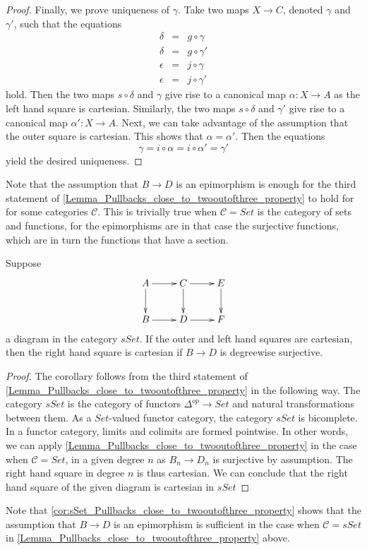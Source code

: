 \begin{proof}
Finally, we prove uniqueness of $\gamma$. Take two maps $X\to C$, denoted $\gamma$ and $\gamma '$, such that the equations
\begin{displaymath}
\begin{array}{rcl}
\delta & = & g\circ \gamma \\
\delta & = & g\circ \gamma ' \\
\epsilon & = & j\circ \gamma \\
\epsilon & = & j\circ \gamma '
\end{array}
\end{displaymath}
hold. Then the two maps $s\circ \delta$ and $\gamma$ give rise to a canonical map $\alpha :X\to A$ as the left hand square is cartesian. Similarly, the two maps $s\circ \delta$ and $\gamma '$ give rise to a canonical map $\alpha ':X\to A$. Next, we can take advantage of the assumption that the outer square is cartesian. This shows that $\alpha =\alpha '$. Then the equations
\[\gamma =i\circ \alpha =i\circ \alpha '=\gamma '\]
yield the desired uniqueness.
\end{proof}
\noindent Note that the assumption that $B\to D$ is an epimorphism is enough for the third statement of \cref{Lemma_Pullbacks_close_to_twooutofthree_property} to hold for for some categories $\mathscr{C}$. This is trivially true when $\mathscr{C} =Set$ is the category of sets and functions, for the epimorphisms are in that case the surjective functions, which are in turn the functions that have a section.
\begin{corollary}\label{cor:sSet_Pullbacks_close_to_twooutofthree_property}
Suppose
\begin{displaymath}
\xymatrix{
A \ar[d] \ar[r] & C \ar[d] \ar[r] & E \ar[d] \\
B \ar[r] & D \ar[r] & F
}
\end{displaymath}
a diagram in the category $sSet$. If the outer and left hand squares are cartesian, then the right hand square is cartesian if $B\to D$ is degreewise surjective.
\end{corollary}
\begin{proof}
The corollary follows from the third statement of \cref{Lemma_Pullbacks_close_to_twooutofthree_property} in the following way. The category $sSet$ is the category of functors $\Delta ^{op} \to Set$ and natural transformations between them. As a $Set$-valued functor category, the category $sSet$ is bicomplete. In a functor category, limits and colimits are formed pointwise. In other words, we can apply \cref{Lemma_Pullbacks_close_to_twooutofthree_property} in the case when $\mathscr{C} =Set$, in a given degree $n$ as $B_n\to D_n$ is surjective by assumption. The right hand square in degree $n$ is thus cartesian. We can conclude that the right hand square of the given diagram is cartesian in $sSet$
\end{proof}
\noindent Note that \cref{cor:sSet_Pullbacks_close_to_twooutofthree_property} shows that the assumption that $B\to D$ is an epimorphism is sufficient in the case when $\mathscr{C} =sSet$ in \cref{Lemma_Pullbacks_close_to_twooutofthree_property} above.

